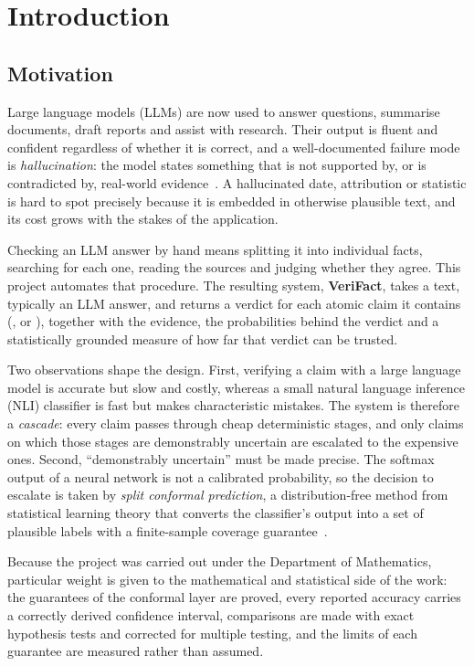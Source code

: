 \chapter{Introduction}
\label{ch:intro}

\section{Motivation}

Large language models (LLMs) are now used to answer questions, summarise documents, draft reports and assist with research. Their output is fluent and confident regardless of whether it is correct, and a well-documented failure mode is \emph{hallucination}: the model states something that is not supported by, or is contradicted by, real-world evidence~\citep{ji2023survey,huang2023survey}. A hallucinated date, attribution or statistic is hard to spot precisely because it is embedded in otherwise plausible text, and its cost grows with the stakes of the application.

Checking an LLM answer by hand means splitting it into individual facts, searching for each one, reading the sources and judging whether they agree. This project automates that procedure. The resulting system, \textbf{VeriFact}, takes a text, typically an LLM answer, and returns a verdict for each atomic claim it contains (\Sup, \Con{} or \Unk), together with the evidence, the probabilities behind the verdict and a statistically grounded measure of how far that verdict can be trusted.

Two observations shape the design. First, verifying a claim with a large language model is accurate but slow and costly, whereas a small natural language inference (NLI) classifier is fast but makes characteristic mistakes. The system is therefore a \emph{cascade}: every claim passes through cheap deterministic stages, and only claims on which those stages are demonstrably uncertain are escalated to the expensive ones. Second, ``demonstrably uncertain'' must be made precise. The softmax output of a neural network is not a calibrated probability, so the decision to escalate is taken by \emph{split conformal prediction}, a distribution-free method from statistical learning theory that converts the classifier's output into a set of plausible labels with a finite-sample coverage guarantee~\citep{vovk2005algorithmic,angelopoulos2021gentle}.

Because the project was carried out under the Department of Mathematics, particular weight is given to the mathematical and statistical side of the work: the guarantees of the conformal layer are proved, every reported accuracy carries a correctly derived confidence interval, comparisons are made with exact hypothesis tests and corrected for multiple testing, and the limits of each guarantee are measured rather than assumed.

